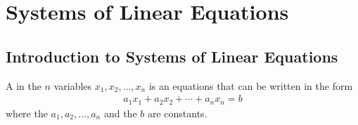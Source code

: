 \documentclass{article}
\begin{document}
\section{Systems of Linear Equations}
\subsection{Introduction to Systems of Linear Equations}
\begin{definition}
    A  in the $n$ variables $x_1, x_2, ..., x_n$ is an equations that can be written in the form
    \begin{gather*}
        a_1x_1+a_2x_2+\cdots+a_nx_n=b
    \end{gather*}
    where the  $a_1, a_2, ..., a_n$ and the  $b$ are constants.
\end{definition}
\end{document}
